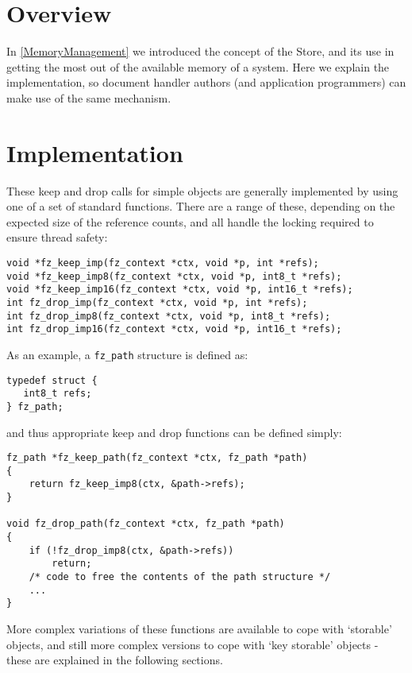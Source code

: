 \documentclass[oneside]{book}
\newcommand{\rjwref}[1] {\autoref{#1} \nameref{#1}}
\begin{document}
\section{Overview}

In \rjwref{MemoryManagement} we introduced the concept of the Store, and its use in getting the most out of the available memory of a system. Here we explain the implementation, so document handler authors (and application programmers) can make use of the same mechanism.

\section{Implementation}

These keep and drop calls for simple objects are generally implemented by using one of a set of standard functions. There are a range of these, depending on the expected size of the reference counts, and all handle the locking required to ensure thread safety:

\begin{lstlisting}
void *fz_keep_imp(fz_context *ctx, void *p, int *refs);
void *fz_keep_imp8(fz_context *ctx, void *p, int8_t *refs);
void *fz_keep_imp16(fz_context *ctx, void *p, int16_t *refs);
int fz_drop_imp(fz_context *ctx, void *p, int *refs);
int fz_drop_imp8(fz_context *ctx, void *p, int8_t *refs);
int fz_drop_imp16(fz_context *ctx, void *p, int16_t *refs);
\end{lstlisting}

As an example, a \texttt{fz\_path} structure is defined as:

\begin{lstlisting}
typedef struct {
   int8_t refs;
} fz_path;
\end{lstlisting}

and thus appropriate keep and drop functions can be defined simply:

\begin{lstlisting}
fz_path *fz_keep_path(fz_context *ctx, fz_path *path)
{
	return fz_keep_imp8(ctx, &path->refs);
}

void fz_drop_path(fz_context *ctx, fz_path *path)
{
	if (!fz_drop_imp8(ctx, &path->refs))
		return;
	/* code to free the contents of the path structure */
	...
}
\end{lstlisting}

More complex variations of these functions are available to cope with `storable' objects, and still more complex versions to cope with `key storable' objects - these are explained in the following sections.
\end{document}
